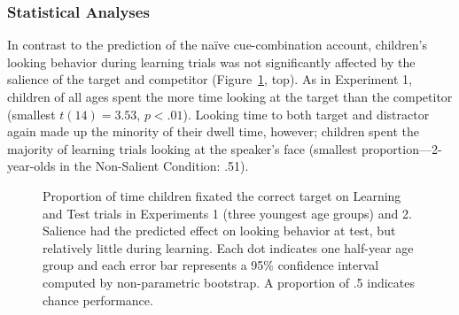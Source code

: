 \documentclass[man,floatsintext]{apa6}
\begin{document}
\subsubsection{Statistical Analyses}

In contrast to the prediction of the na\"{i}ve cue-combination account, children's looking behavior during learning trials was not significantly affected by the salience of the target and competitor (Figure~\ref{fig:exp1_2}, top). As in Experiment 1, children of all ages spent the more time looking at the target than the competitor (smallest $t(14)  = 3.53$, $p < .01$). Looking time to both target and distractor again made up the minority of their dwell time, however; children spent the majority of learning trials looking at the speaker's face (smallest proportion---2-year-olds in the Non-Salient Condition: .51).


\begin{figure}[t]
	\caption{\label{fig:exp1_2} Proportion of time children fixated the correct target on Learning and Test trials in Experiments 1 (three youngest age groups) and 2. Salience had the predicted effect on looking behavior at test, but relatively little during learning. Each dot indicates one half-year age group and each error bar represents a 95\% confidence interval computed by non-parametric bootstrap. A proportion of .5 indicates chance performance.}
\end{figure}
\end{document}
